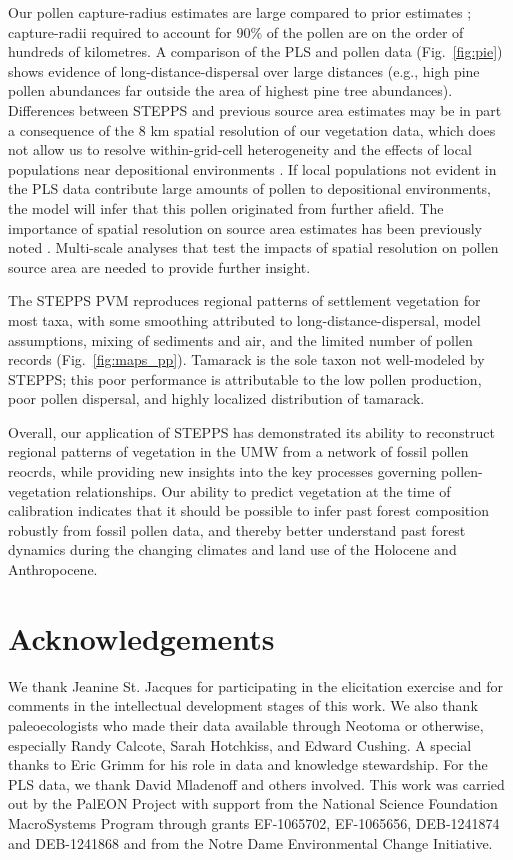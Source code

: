 \documentclass[12pt]{article}
\begin{document}
Our pollen capture-radius estimates are large compared to prior
estimates
\citep{sugita2007theory2,sugita1994pollen,williams2003palynological,prentice1987quantitative,bradshaw1985relationships};
capture-radii required to account for 90\% of the pollen are on the
order of hundreds of kilometres. A comparison of the PLS and pollen
data (Fig.~\ref{fig:pie}) shows evidence of long-distance-dispersal
over large distances (e.g., high pine pollen abundances far outside
the area of highest pine tree abundances). Differences between STEPPS
and previous source area estimates may be in part a consequence of the
8 km spatial resolution of our vegetation data, which does not allow
us to resolve within-grid-cell heterogeneity and the effects of local
populations near depositional environments
\citep{jacobson1981selection, bradshaw1985relationships,
  jackson1990}. If local populations not evident in the PLS data
contribute large amounts of pollen to depositional environments, the
model will infer that this pollen originated from further afield. The
importance of spatial resolution on source area estimates has been
previously noted \citep{sugita1994pollen}. Multi-scale analyses that
test the impacts of spatial resolution on pollen source area are
needed to provide further insight.

The STEPPS PVM reproduces regional patterns of settlement vegetation
for most taxa, with some smoothing attributed to
long-distance-dispersal, model assumptions, mixing of sediments and
air, and the limited number of pollen records
(Fig.~\ref{fig:maps_pp}). Tamarack is the sole taxon not well-modeled
by STEPPS; this poor performance is attributable to the low pollen
production, poor pollen dispersal, and highly localized distribution
of tamarack.

Overall, our application of STEPPS has demonstrated its ability to
reconstruct regional patterns of vegetation in the UMW
from a network of fossil pollen reocrds, while providing new insights
into the key processes governing pollen-vegetation relationships. Our
ability to predict vegetation at the time of calibration indicates
that it should be possible to infer past forest composition robustly
from fossil pollen data, and thereby better understand past forest
dynamics during the changing climates and land use of the Holocene and
Anthropocene.

\section*{Acknowledgements}
We thank Jeanine St. Jacques for participating in the elicitation
exercise and for comments in the intellectual development stages of
this work. We also thank paleoecologists who made their data available
through Neotoma or otherwise, especially Randy Calcote, Sarah
Hotchkiss, and Edward Cushing. A special thanks to Eric Grimm for his
role in data and knowledge stewardship. For the PLS data, we thank
David Mladenoff and others involved. This work was carried out by the
PalEON Project with support from the National Science Foundation
MacroSystems Program through grants EF-1065702, EF-1065656,
DEB-1241874 and DEB-1241868 and from the Notre Dame Environmental
Change Initiative.
\end{document}
